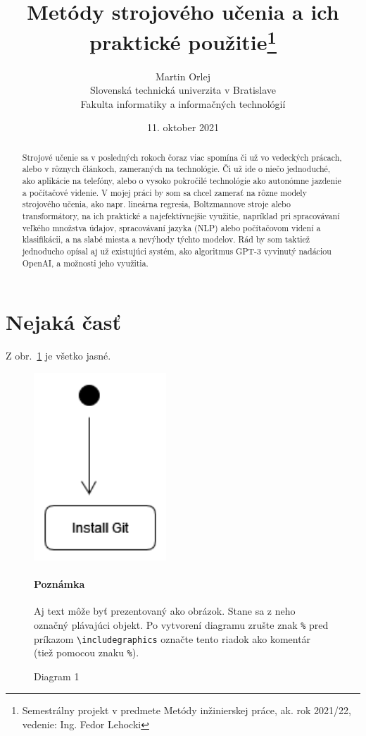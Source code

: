 \documentclass[10pt,twoside,slovak,a4paper]{article}
\title{Metódy strojového učenia a ich praktické použitie\thanks{Semestrálny projekt v predmete Metódy inžinierskej práce, ak. rok 2021/22, vedenie: Ing. Fedor Lehocki}}
\author{Martin Orlej\\[2pt]
	{\small Slovenská technická univerzita v Bratislave}\\
	{\small Fakulta informatiky a informačných technológií}\\
	}
\date{\small 11. oktober 2021}
\begin{document}
\maketitle

\begin{abstract}
Strojové učenie sa v posledných rokoch čoraz viac spomína či už vo vedeckých prácach, alebo v rôznych článkoch, zameraných na technológie. Či už ide o niečo jednoduché, ako aplikácie na telefóny, alebo o vysoko pokročilé technológie ako autonómne jazdenie a počítačové videnie. V mojej práci by som sa chcel zamerať na rôzne modely strojového učenia, ako napr. lineárna regresia, Boltzmannove stroje alebo transformátory, na ich praktické a najefektívnejšie využitie, napríklad pri spracovávaní veľkého množstva údajov, spracovávaní jazyka (NLP) alebo počítačovom videní a klasifikácii, a na slabé miesta a nevýhody týchto modelov. Rád by som taktiež jednoducho opísal aj už existujúci systém, ako algoritmus GPT-3 vyvinutý nadáciou OpenAI, a možnosti jeho využitia.
\end{abstract}









\section{Nejaká časť} \label{nejaka}

Z obr.~\ref{f:rozhod} je všetko jasné. 

\begin{figure}[tbh]
\centering
\includegraphics[scale=1.0]{diagram.pdf}
\caption{Diagram 1}
\paragraph{Poznámka} Aj text môže byť prezentovaný ako obrázok. Stane sa z neho označný plávajúci objekt. Po vytvorení diagramu zrušte znak \texttt{\%} pred príkazom \verb|\includegraphics| označte tento riadok ako komentár (tiež pomocou znaku \texttt{\%}).

\label{f:rozhod}
\end{figure}
\end{document}

